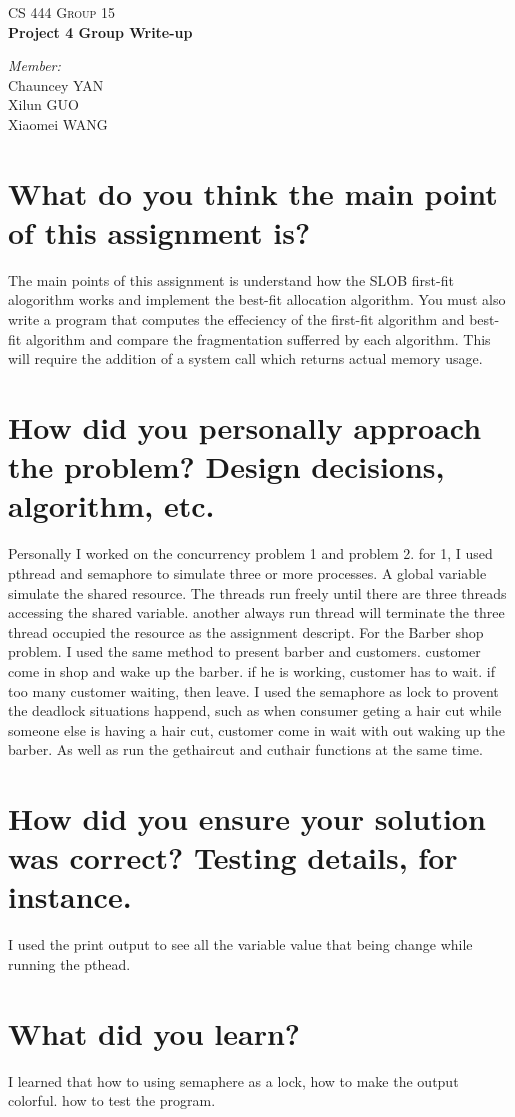 \documentclass[letterpaper,10pt]{article}
\begin{document}

\begin{center}
\textsc{\LARGE CS 444 Group 15}\\

{ \huge \bfseries Project 4 Group Write-up\\}

\emph{Member:}\\
Chauncey \textsc{YAN}\\
Xilun \textsc{GUO}\\
Xiaomei \textsc{WANG}\\

\end{center}

\section{What do you think the main point of this assignment is?}
The main points of this assignment is understand how the SLOB first-fit alogorithm works and implement the best-fit allocation algorithm. You must also write a program that computes the effeciency of the first-fit algorithm and best-fit algorithm and compare the fragmentation sufferred by each algorithm. This will require the addition of a system call which returns actual memory usage.
\section{How did you personally approach the problem? Design decisions, algorithm, etc.}
Personally I worked on the concurrency problem 1 and problem 2. for 1, I used pthread and semaphore to simulate three or more processes. A global variable simulate the shared resource. The threads run freely until there are three threads accessing the shared variable. another always run thread will terminate the three thread occupied the resource as the assignment descript.
For the Barber shop problem. I used the same method to present barber and customers. customer come in shop and wake up the barber. if he is working, customer has to wait. if too many customer waiting, then leave. I used the semaphore as lock to provent the deadlock situations happend, such as when consumer geting a hair cut while someone else is having a hair cut, customer come in wait with out waking up the barber. As well as run the gethaircut and cuthair functions at the same time. 

\section{How did you ensure your solution was correct? Testing details, for instance.} 
I used the print output to see all the variable value that being change while running the pthead.
\section{What did you learn?}
I learned that how to using semaphere as a lock, how to make the output colorful. how to test the program.  
\end{document}
